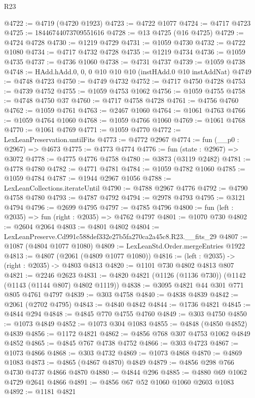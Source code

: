 \begin{lexlean}{R23}
\begin{coremodule}
@4722 := @4719 (@4720 @1923)
@4723 := @4722 @1077
@4724 := @4717 @4723
@4725 := 18446744073709551616
@4728 := @13 @4725 (@16 @4725)
@4729 := @4724 @4728
@4730 := @1219 @4729
@4731 := @1059 @4730
@4732 := @4722 @1080
@4734 := @4717 @4732 @4728
@4735 := @1219 @4734
@4736 := @1059 @4735
@4737 := @4736 @1060
@4738 := @4731 @4737
@4739 := @1059 @4738
@4748 := HAdd.hAdd.{0, 0, 0} @10 @10 @10 (instHAdd.{0} @10 instAddNat)
@4749 := @4748 @4723
@4750 := @4749 @4732
@4752 := @4717 @4750 @4728
@4753 := @4739 @4752
@4755 := @1059 @4753 @1062
@4756 := @1059 @4755
@4758 := @4748 @4750 @37
@4760 := @4717 @4758 @4728
@4761 := @4756 @4760
@4762 := @1059 @4761
@4763 := @2467 @1060
@4764 := @1061 @4763
@4766 := @1059 @4764 @1060
@4768 := @1059 @4766 @1060
@4769 := @1061 @4768
@4770 := @1061 @4769
@4771 := @1059 @4770
@4772 := LexLeanPreservation.untilFits
@4773 := @4772 @2967
@4774 := fun (__p0 : @2967) => @4673
@4775 := @4773 @4774
@4776 := fun (state : @2967) => @3072
@4778 := @4775 @4776 @4758
@4780 := @3873 (@3119 @2482)
@4781 := @4778 @4780
@4782 := @4771 @4781
@4784 := @1059 @4782 @1060
@4785 := @1059 @4784
@4787 := @1944 @2967 @1056
@4788 := LexLeanCollections.iterateUntil
@4790 := @4788 @2967 @4776
@4792 := @4790 @4758 @4780
@4793 := @4787 @4792
@4794 := @2978 @4793
@4795 := @3121 @4794
@4796 := @2699 @4795
@4797 := @4785 @4796
@4800 := fun (left : @2035) => fun (right : @2035) => @4762 @4797
@4801 := @1070 @730
@4802 := @2604 @2064
@4803 := @4801 @4802
@4804 := LexLeanPreserve.Cd991c588def332e27b5fa270ca2a45c8.R23.__fits_29
@4807 := @1087 (@4804 @1077 @1080)
@4809 := LexLeanStd.Order.mergeEntries @1922
@4813 := @4807 (@2061 (@4809 @1077 @1080))
@4816 := (left : @2035) -> (right : @2035) -> @4803 @4813
@4820 := @1101 @730 @4802 @4813 @807
@4821 := @2246 @2623
@4831 := @4820 @4821 (@1126 (@1136 @730)) (@1142 (@1143 (@1144 @807) @4802 @1119))
@4838 := @3095 @4821 @44 @301 @771 @805 @4761 @4797
@4839 := @303 @4758
@4840 := @4838 @4839
@4842 := @2061 (@2702 @4795)
@4843 := @4840 @4842
@4844 := @1736 @4821
@4845 := @4844 @294
@4848 := @4845 @770 @4755 @4760
@4849 := @303 @4750
@4850 := @1073 @4849
@4852 := @1073 @304 @1083
@4855 := @4848 (@4850 @4852) @4839
@4856 := @1172 @4821
@4862 := @4856 @768 @307 @4753 @1062 @4849 @4852
@4865 := @4845 @767 @4738 @4752
@4866 := @303 @4723
@4867 := @1073 @4866
@4868 := @303 @4732
@4869 := @1073 @4868
@4870 := @4869 @1083
@4873 := @4865 (@4867 @4870) @4849
@4879 := @4856 @298 @766 @4730 @4737 @4866 @4870
@4880 := @4844 @296
@4885 := @4880 @69 @1062 @4729 @2641 @4866
@4891 := @4856 @67 @52 @1060 @1060 @2603 @1083
@4892 := @1181 @4821

\end{coremodule}
\end{lexlean}
